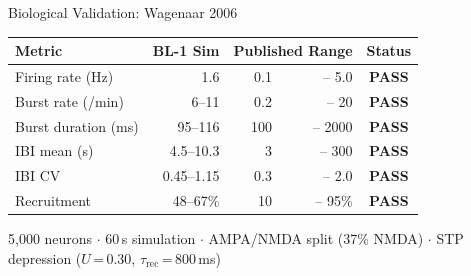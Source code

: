 \documentclass[aspectratio=169,10pt]{beamer}
\begin{document}
\begin{frame}{Biological Validation: Wagenaar 2006}
\centering
\small
\begin{tabular}{lrrrc}
\toprule
\textbf{Metric} & \textbf{BL-1 Sim} & \multicolumn{2}{c}{\textbf{Published Range}} & \textbf{Status} \\
\midrule
Firing rate (Hz)       & 1.6        & 0.1   & -- 5.0    & \textcolor{bl1green}{\textbf{PASS}} \\
Burst rate (/min)      & 6--11      & 0.2   & -- 20     & \textcolor{bl1green}{\textbf{PASS}} \\
Burst duration (ms)    & 95--116    & 100   & -- 2000   & \textcolor{bl1green}{\textbf{PASS}} \\
IBI mean (s)           & 4.5--10.3  & 3     & -- 300    & \textcolor{bl1green}{\textbf{PASS}} \\
IBI CV                 & 0.45--1.15 & 0.3   & -- 2.0    & \textcolor{bl1green}{\textbf{PASS}} \\
Recruitment            & 48--67\%   & 10    & -- 95\%   & \textcolor{bl1green}{\textbf{PASS}} \\
\bottomrule
\end{tabular}

\vspace{12pt}


\vspace{8pt}
\scriptsize
5,000 neurons $\cdot$ 60\,s simulation $\cdot$ AMPA/NMDA split (37\% NMDA) $\cdot$ STP depression ($U$\,=\,0.30, $\tau_{\mathrm{rec}}$\,=\,800\,ms)
\end{frame}
\end{document}
